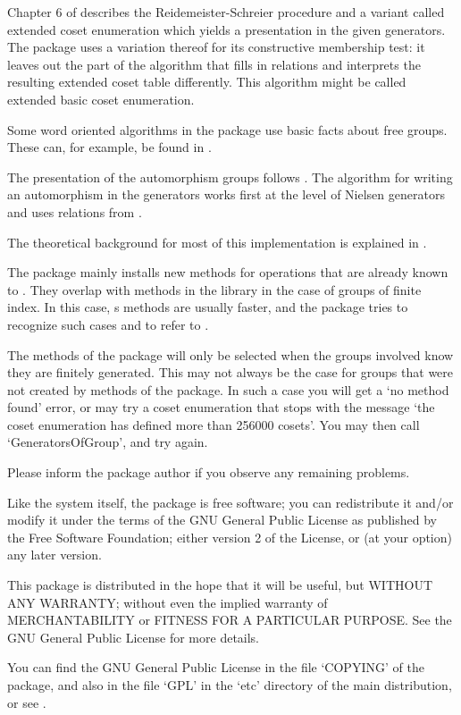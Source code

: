 Chapter 6 of \cite{Sims94} describes the Reidemeister-Schreier
procedure and a variant called extended coset enumeration which yields
a presentation in the given generators.  The {\FGA} package uses a
variation thereof for its constructive membership test: it leaves out the
part of the algorithm that fills in relations and interprets the
resulting extended coset table differently.
This algorithm might be called extended basic coset enumeration.

Some word oriented algorithms in the {\FGA} package use basic facts about
free groups.  These can, for example, be found in \cite{LyndonSchupp77}.

The presentation of the automorphism groups follows \cite{Neumann33}.
The algorithm for writing an automorphism in the generators works
first at the level of Nielsen generators and uses relations from
\cite{Nielsen}.

The theoretical background for most of this implementation is
explained in \cite{Sievers03}.


The {\FGA} package mainly installs new methods for operations that are
already known to {\GAP}.  They overlap with methods in the {\GAP}
library in the case of groups of finite index.  In this case, {\GAP}s
methods are usually faster, and the {\FGA} package tries to recognize
such cases and to refer to {\GAP}.

The methods of the {\FGA} package will only be selected when the groups
involved know they are finitely generated.  This may not always be the
case for groups that were not created by methods of the {\FGA}
package.  In such a case you will get a `no method found' error, or
{\GAP} may try a coset enumeration that stops with the message
`the coset enumeration has defined more than 256000 cosets'.
You may then call `GeneratorsOfGroup', and try again.

Please inform the package author if you observe any remaining problems.


Like the {\GAP} system itself, the {\FGA} package is free software;
you can redistribute it and/or modify it under the terms of the GNU
General Public License as published by the Free Software Foundation;
either version 2 of the License, or (at your option) any later
version.

This package is distributed in the hope that it will be useful, but
WITHOUT ANY WARRANTY; without even the implied warranty of
MERCHANTABILITY or FITNESS FOR A PARTICULAR PURPOSE.  See the GNU
General Public License for more details.

You can find the GNU General Public License in the file `COPYING' of
the {\FGA} package, and also in the file `GPL' in the `etc' directory
of the main {\GAP} distribution, or see
.

